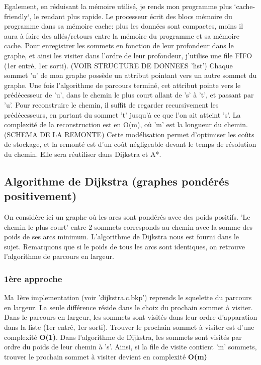 \documentclass[10pt]{article}
\begin{document}
			Egalement, en réduisant la mémoire utilisé, je rends mon programme plus `cache-friendly`, le rendant plus rapide.
			Le processeur écrit des blocs mémoire du programme dans sa mémoire cache: plus les données sont compactes,
			moins il aura à faire des allés/retours entre la mémoire du programme et sa mémoire cache.\newline\newline
			Pour enregistrer les sommets en fonction de leur profondeur dans le graphe, et ainsi les visiter dans l'ordre de leur profondeur,
			j'utilise une file FIFO (1er entré, 1er sorti).\newline
			(VOIR STRUCTURE DE DONNEES 'list')\newline\newline
			Chaque sommet 'u' de mon graphe possède un attribut pointant vers un autre sommet du graphe.
			Une fois l'algorithme de parcours terminé, cet attribut pointe vers le prédécesseur de 'u',
			dans le chemin le plus court allant de 's' à 't', et passant par 'u'.
			Pour reconstruire le chemin, il suffit de regarder recursivement les prédécesseurs, en partant du sommet
			't' jusqu'à ce que l'on ait atteint 's'.
			La complexité de la reconstruction est en O(m), où 'm' est la longueur du chemin.\newline\newline
			(SCHEMA DE LA REMONTE)\newline\newline
			Cette modélisation permet d'optimiser les coûts de stockage, et la remonté est d'un coût négligeable devant le temps
			de résolution du chemin. Elle sera réutiliser dans Dijkstra et A*.
			
		\subsection{Algorithme de Dijkstra (graphes pondérés positivement)}
			On considère ici un graphe où les arcs sont pondérés avec des poids positifs.\newline
			'Le chemin le plus court' entre 2 sommets corresponds au chemin avec la somme des poids de ses arcs minimum.\newline
			L'algorithme de Dijkstra nous est fourni dans le sujet. Remarquons que si le poids de tous les arcs sont identiques,
			on retrouve l'algorithme de parcours en largeur.
			\subsubsection{1ère approche}
				Ma 1ère implementation (voir 'dijkstra.c.bkp') reprends le squelette du parcours en largeur.
				La seule différence réside dans le choix du prochain sommet à visiter. Dans le parcours en largeur,
				les sommets sont visités dans leur ordre d'apparation dans la liste (1er entré, 1er sorti).
				Trouver le prochain sommet à visiter est d'une complexité \textbf{O(1)}.\newline\newline
				Dans l'algorithme de Dijkstra, les sommets sont visités par ordre du poids de leur chemin à 's'.
				Ainsi, si la file de visite contient 'm' sommets, trouver le prochain sommet
				à visiter devient en complexité \textbf{O(m)}
\end{document}
